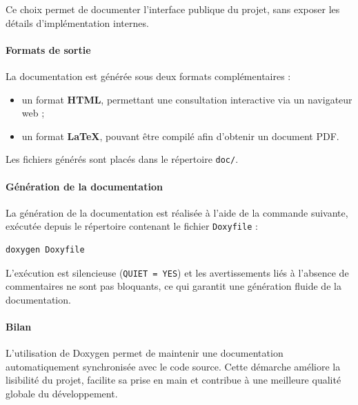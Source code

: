 Ce choix permet de documenter l’interface publique du projet,
sans exposer les détails d’implémentation internes.



\paragraph{Formats de sortie}

La documentation est générée sous deux formats complémentaires :
\begin{itemize}
    \item un format \textbf{HTML}, permettant une consultation interactive
    via un navigateur web ;
    \item un format \textbf{LaTeX}, pouvant être compilé afin d’obtenir
    un document PDF.
\end{itemize}

Les fichiers générés sont placés dans le répertoire \texttt{doc/}.

\paragraph{Génération de la documentation}

La génération de la documentation est réalisée à l’aide de la commande suivante,
exécutée depuis le répertoire contenant le fichier \texttt{Doxyfile} :

\begin{verbatim}
doxygen Doxyfile
\end{verbatim}

L’exécution est silencieuse (\texttt{QUIET = YES}) et les avertissements
liés à l’absence de commentaires ne sont pas bloquants,
ce qui garantit une génération fluide de la documentation.



\paragraph{Bilan}

L’utilisation de Doxygen permet de maintenir une documentation automatiquement
synchronisée avec le code source.
Cette démarche améliore la lisibilité du projet, facilite sa prise en main
et contribue à une meilleure qualité globale du développement.
